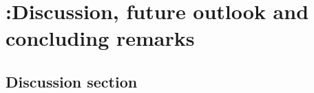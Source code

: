 \chapter[Discussion, future outlook and concluding remarks]{{\color{red} :}Discussion, future outlook and concluding remarks}
\label{ch:discussion}

\noindent \kant[15]


\section{Discussion section}

\kant[16-18]
